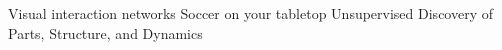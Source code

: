 \documentclass[12pt]{article}
\begin{document}
Visual interaction networks
\cite{watters2017visual}
Soccer on your tabletop
Unsupervised Discovery of Parts, Structure, and Dynamics


\end{document}
